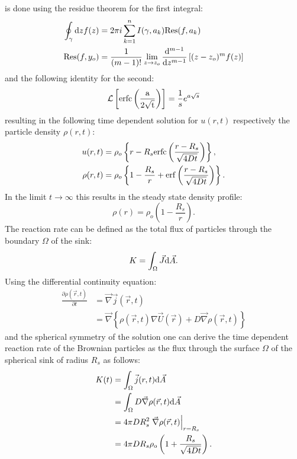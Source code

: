 is done using the residue theorem for the first integral:
\begin{align}
    \oint_{ \gamma } {\rm d}z f(z) &= 2 \pi i \sum_{k = 1}^{n}I(\gamma, a_k) {\rm Res}(f,a_k) \\
    { \rm Res}(f,y_o) &= \frac{1}{(m-1)!} \lim_{z\rightarrow z_o} \frac{{ \rm d} ^{m-1}}{{\rm d} z^{m-1}} \left[ (z - z_o)^{m}f(z) \right]
    \label{residue theorem}
\end{align}
and the following identity for the second:
\begin{equation}
    \mathcal{L}\left[ {\rm erfc\left( \frac{a}{2\sqrt{t}} \right)} \right] = \frac{1}{s}e^{a\sqrt{s}}
    \label{L(erfc)}
\end{equation}
resulting in the following time dependent solution for $u(r,t)$ respectively the particle density $\rho(r,t)$:
\begin{align}
    u(r,t) &= \rho_o \left\{ r - R_s {\rm erfc} \left( \frac{r - R_s}{\sqrt{4 D t}} \right) \right\}, \\
    \rho(r,t) &= \rho_o \left\{ 1 - \frac{R_s}{r} + {\rm erf} \left( \frac{r - R_s}{\sqrt{4Dt}} \right) \right\}.
    \label{u(r,t)}
\end{align}
In the limit $t \rightarrow \infty$ this results in the steady state density profile:
\begin{equation}
    \rho(r) =  \rho_o \left( 1 - \frac{R_s}{r} \right).
    \label{steady_state_density}
\end{equation}
The reaction rate can be defined as the total flux of particles through the boundary $\Omega$ of the sink:
\begin{equation}
    K = \int_\Omega \vec{J} {\rm d}\vec{A} .
    \label{reaction rate}
\end{equation}
Using the differential continuity equation:
\begin{align}
    \frac{\partial \rho(\vec{r},t)}{\partial t}&= \vec{\nabla} \vec{j}(\vec{r},t) \nonumber \\
    &= \vec{\nabla} \left\{ \rho(\vec{r},t) \nabla \vec{U}(\vec{r}) + D \vec{\nabla} \rho(\vec{r},t) \right\}
    \label{contiuity_equation}
\end{align}
and the spherical symmetry of the solution one can derive the time dependent reaction rate of the Brownian particles as the flux through the surface $\Omega$ of the spherical sink of radius $R_s$ as follows:
\begin{align}
    K(t) &= \int_\Omega \vec j(r,t) {\rm d} \vec A \nonumber \\
    &= \int_\Omega D  \vec{\nabla} \rho(\vec{r},t) {\rm d} \vec{A} \nonumber \\
    &= 4 \pi D R_s^2 \left. \vec{\nabla} \rho(\vec{r},t) \right|_{r = R_s} \nonumber \\
    &= 4 \pi D R_s \rho_o \left( 1 + \frac{R_s}{\sqrt{4Dt}} \right).
    \label{ideal reaction rate}
\end{align}
